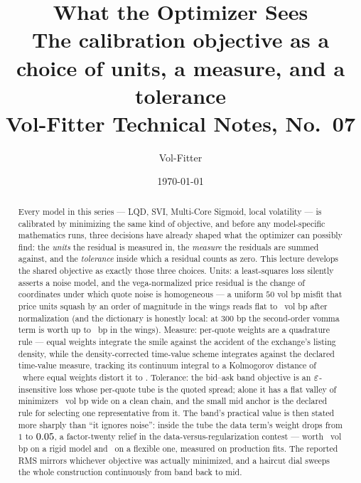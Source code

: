 \documentclass[11pt]{article}
\title{\textbf{What the Optimizer Sees}\\[2pt]
\large The calibration objective as a choice of units, a measure, and a
tolerance\\[2pt]
\normalsize Vol-Fitter Technical Notes, No.~07}
\author{Vol-Fitter}
\date{\today}
\begin{document}
\maketitle



\begin{abstract}
Every model in this series --- LQD, SVI, Multi-Core Sigmoid, local
volatility --- is calibrated by minimizing the same kind of objective, and
before any model-specific mathematics runs, three decisions have already
shaped what the optimizer can possibly find: the \emph{units} the residual
is measured in, the \emph{measure} the residuals are summed against, and
the \emph{tolerance} inside which a residual counts as zero.  This lecture
develops the shared objective as exactly those three choices.  Units: a
least-squares loss silently asserts a noise model, and the vega-normalized
price residual is the change of coordinates under which quote noise is
homogeneous --- a uniform $50$ vol bp misfit that price units squash by an
order of magnitude in the wings reads flat to \objmunitserrsmall\ vol bp
after normalization (and the dictionary is honestly local: at $300$ bp the
second-order vomma term is worth up to \objmunitserrbig\ bp in the wings).
Measure: per-quote weights are a quadrature rule --- equal weights
integrate the smile against the accident of the exchange's listing
density, while the density-corrected time-value scheme integrates against
the declared time-value measure, tracking its continuum integral to a
Kolmogorov distance of \objmmeaserrtv\ where equal weights distort it to
\objmmeaserreq.  Tolerance: the bid--ask band objective is an
$\varepsilon$-insensitive loss whose per-quote tube is the quoted spread; alone
it has a flat valley of minimizers \objmvalley\ vol bp wide on a clean
chain, and the small mid anchor is the declared rule for selecting one
representative from it.  The band's practical value is then stated more
sharply than ``it ignores noise'': inside the tube the data term's weight
drops from $1$ to $0.05$, a factor-twenty relief in the
data-versus-regularization contest --- worth \objmflexrigid\ vol bp on a
rigid model and \objmflexflex\ on a flexible one, measured on production
fits.  The reported RMS mirrors whichever objective was actually
minimized, and a haircut dial sweeps the whole construction continuously
from band back to mid.
\end{abstract}
\end{document}
